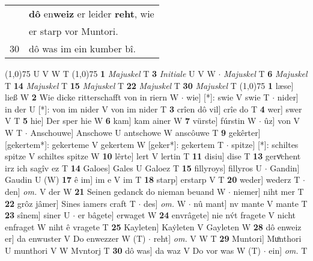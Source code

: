 \documentclass[8pt,a4paper,notitlepage]{article}
\begin{document}
\begin{table}[ht]
\begin{minipage}[t]{0.5\linewidth}
\begin{tabular}{rl}
 & \textbf{dô} en\textbf{weiz} er leider \textbf{reht}, wie\\ 
 & er starp vor Muntori.\\ 
30 & dô was im ein kumber bî.\\ 
\end{tabular}
\scriptsize
\line(1,0){75} \newline
U V W T \newline
\line(1,0){75} \newline
\textbf{1} \textit{Majuskel} T  \textbf{3} \textit{Initiale} U V W   $\cdot$ \textit{Majuskel} T  \textbf{6} \textit{Majuskel} T  \textbf{14} \textit{Majuskel} T  \textbf{15} \textit{Majuskel} T  \textbf{22} \textit{Majuskel} T  \textbf{30} \textit{Majuskel} T  \newline
\line(1,0){75} \newline
\textbf{1} læse] ließ W \textbf{2} Wie dicke ritterschafft von in riern W  $\cdot$ wie] [*]: swie V swie T  $\cdot$ nider] in der U [*]: von im nider V von im nider T \textbf{3} crîen dô vil] crîe do T \textbf{4} wer] swer V T \textbf{5} hie] Der sper hie W \textbf{6} kam] kam ainer W \textbf{7} vürste] fúrstin W  $\cdot$ ûz] von V W T  $\cdot$ Anschouwe] Anschowe U antschowe W anscôuwe T \textbf{9} gekêrter] [gekertem*]: gekerteme V gekertem W [geker*]: gekertem T  $\cdot$ spitze] [*]: schiltes spitze V schiltes spitze W \textbf{10} lêrte] lert V lertin T \textbf{11} disiu] dise T \textbf{13} gervͦchent irz ich sagîv ez T \textbf{14} Galoes] Gales U Galoez T \textbf{15} fillyroys] fillyros U  $\cdot$ Gandin] Gaudin U (W) \textbf{17} ê im] im e V im T \textbf{18} starp] erstarp V T \textbf{20} weder] wederz T  $\cdot$ den] \textit{om.} V der W \textbf{21} Seinen gedanck do nieman beuand W  $\cdot$ niemer] niht mer T \textbf{22} grôz jâmer] Sines iamers craft T  $\cdot$ des] \textit{om.} W  $\cdot$ nû mant] nv mante V mante T \textbf{23} sînem] siner U  $\cdot$ er bâgete] erwaget W \textbf{24} envrâgete] nie nv́t fragete V nicht enfraget W niht ê vragete T \textbf{25} Kayleten] Kaẏleten V Gayleten W \textbf{28} dô enweiz er] da enwuster V Do enwezzer W (T)  $\cdot$ reht] \textit{om.} V W T \textbf{29} Muntori] Muͦnthori U munthori V W Mvntorj T \textbf{30} dô was] da waz V Do vor was W (T)  $\cdot$ ein] \textit{om.} T \newline
\end{minipage}
\end{table}
\end{document}
